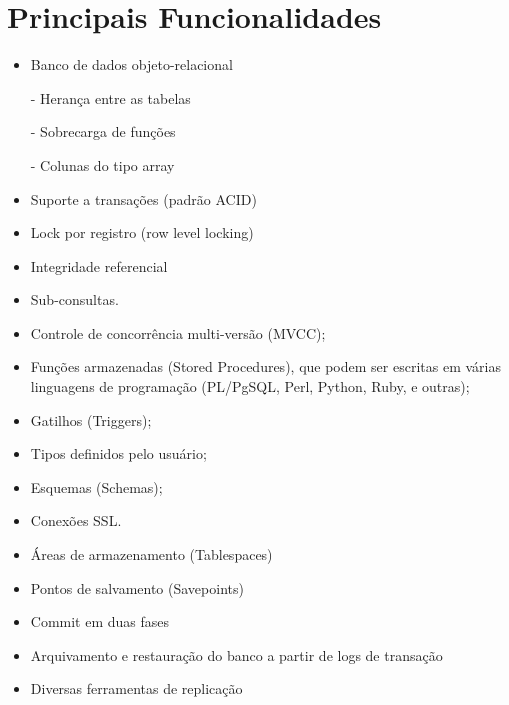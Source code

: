 \section{ Principais Funcionalidades}\setcounter{SteP}{1}

\begin{itemize}
\item{\bf }Banco de dados objeto-relacional

    - Herança entre as tabelas

    - Sobrecarga de funções

    - Colunas do tipo array

\item{\bf }Suporte a transações (padrão ACID)

\item{\bf }Lock por registro (row level locking)

\item{\bf }Integridade referencial

\item{\bf }Sub-consultas.

\item{\bf }Controle de concorrência multi-versão (MVCC);

\item{\bf }Funções armazenadas (Stored Procedures), que podem ser escritas em várias linguagens de programação (PL/PgSQL, Perl, Python, Ruby, e outras);

\item{\bf }Gatilhos (Triggers);

\item{\bf }Tipos definidos pelo usuário;

\item{\bf }Esquemas (Schemas);

\item{\bf }Conexões SSL.

\item{\bf }Áreas de armazenamento (Tablespaces)

\item{\bf }Pontos de salvamento (Savepoints)

\item{\bf }Commit em duas fases

\item{\bf }Arquivamento e restauração do banco a partir de logs de transação

\item{\bf }Diversas ferramentas de replicação


\end{itemize}
